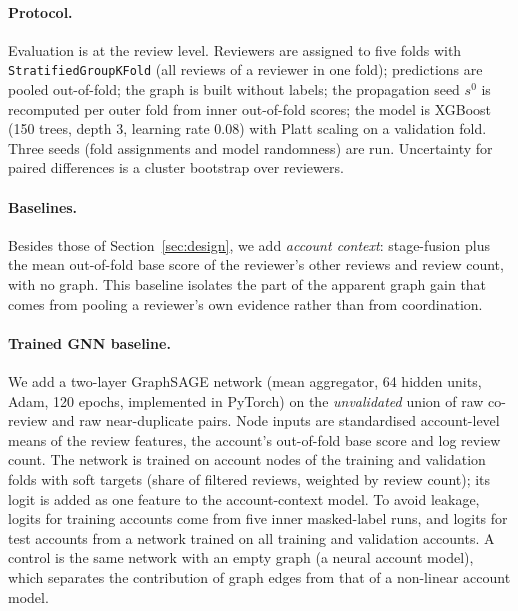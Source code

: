 \documentclass[pdflatex,sn-basic]{sn-jnl}
\theoremstyle{thmstyleone}
\theoremstyle{thmstylethree}
\begin{document}
\paragraph{Protocol.} Evaluation is at the review level. Reviewers are assigned to five folds with \texttt{StratifiedGroupKFold} (all reviews of a reviewer in one fold); predictions are pooled out-of-fold; the graph is built without labels; the propagation seed $s^0$ is recomputed per outer fold from inner out-of-fold scores; the model is XGBoost (150 trees, depth 3, learning rate 0.08) with Platt scaling on a validation fold. Three seeds (fold assignments and model randomness) are run. Uncertainty for paired differences is a cluster bootstrap over reviewers.

\paragraph{Baselines.} Besides those of Section~\ref{sec:design}, we add \emph{account context}: stage-fusion plus the mean out-of-fold base score of the reviewer's other reviews and review count, with no graph. This baseline isolates the part of the apparent graph gain that comes from pooling a reviewer's own evidence rather than from coordination.

\paragraph{Trained GNN baseline.} We add a two-layer GraphSAGE network (mean aggregator, 64 hidden units, Adam, 120 epochs, implemented in PyTorch) on the \emph{unvalidated} union of raw co-review and raw near-duplicate pairs. Node inputs are standardised account-level means of the review features, the account's out-of-fold base score and log review count. The network is trained on account nodes of the training and validation folds with soft targets (share of filtered reviews, weighted by review count); its logit is added as one feature to the account-context model. To avoid leakage, logits for training accounts come from five inner masked-label runs, and logits for test accounts from a network trained on all training and validation accounts. A control is the same network with an empty graph (a neural account model), which separates the contribution of graph edges from that of a non-linear account model.
\end{document}
